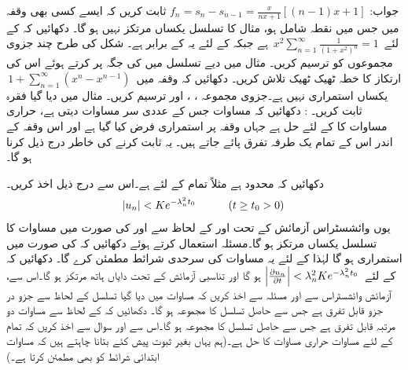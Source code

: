 جواب:\quad
$f_n=s_n-s_{n-1}=\frac{x}{nx+1}[(n-1)x+1]$
\quad
ثابت کریں کہ ایسے کسی بھی  وقفہ میں جس میں نقطہ  شامل ہو، مثال  کا تسلسل یکساں مرتکز نہیں ہو گا۔ 
\quad
دکھائیں کہ   کے لئے 
$\,x^2\sum\limits_{n=1}^{\infty} \tfrac{1}{(1+x^2)^n}=1\,$
ہے جبکہ  کے لئے یہ  کے برابر ہے۔ شکل  کی طرح چند جزوی مجموعوں کو ترسیم کریں۔
\quad
مثال  میں دیے تسلسل میں  کی جگہ  پر کرتے ہوئے اس کی  ارتکاز کا خطہ ٹھیک ٹھیک تلاش کریں۔
\quad
دکھائیں کہ وقفہ  میں 
$\,1+\sum\limits_{n=1}^{\infty} (x^n-x^{n-1})\,$
یکساں استمراری نہیں ہے۔جزوی مجموعہ ، ،  اور  ترسیم کریں۔
\quad
مثال  میں دیا گیا فقرہ ثابت کریں۔
: دکھائیں کہ مساوات  جس کے عددی سر مساوات  دیتی ہے، حراری مساوات کا   کے لئے حل ہے جہاں وقفہ  پر  استمراری فرض کیا گیا ہے اور اس وقفہ کے اندر اس کے تمام یک طرفہ تفرق پائے جاتے ہیں۔ یہ ثابت کرنے کی خاطر درج ذیل کرنا ہو گا۔

\quad
دکھائیں کہ  محدود ہے مثلاً تمام  کے لئے  ہے۔اس سے  درج ذیل اخذ کریں۔ 
\begin{align*}
\abs{u_n}<K e^{-\lambda_n^2 t_0}\quad \quad \quad (t\ge t_0 >0)
\end{align*}
یوں وائشسٹراس آزمائش  کے تحت   اور  کے لحاظ سے  اور  کی صورت میں مساوات  کا تسلسل یکساں مرتکز ہو گا۔مسئلہ  استعمال کرتے ہوئے دکھائیں کہ  کی صورت میں  استمراری ہو گا  لہٰذا  کے لئے یہ مساوات  کی سرحدی شرائط مطمئن کرے گا۔
\quad
دکھائیں کہ  کے لئے
$\,\abs{\frac{\partial u_n}{\partial t}}<\lambda^2_n Ke^{-\lambda^2_n t_0}\,$
ہو گا اور تناسبی آزمائش کے تحت دایاں ہاتھ مرتکز ہو گا۔اس سے، آزمائش وائشسٹراس سے اور مسئلہ  سے  اخذ کریں کہ مساوات  میں دیا گیا تسلسل  کے لحاظ سے جزو در جزو قابل تفرق ہے جس سے  حاصل تسلسل کا مجموعہ  ہو گا۔ دکھائیں کہ  کے لحاظ سے مساوات   دو مرتبہ قابل تفرق ہے جس سے  حاصل تسلسل کا مجموعہ
  ہو گا۔اس سے اور سوال  سے اخذ کریں کہ تمام  کے لئے مساوات  حراری مساوات کا حل ہے۔(ہم یہاں بغیر ثبوت پیش کئے بتانا چاہتے ہیں کہ مساوات  ابتدائی شرائط کو بھی مطمئن کرتا ہے۔)

